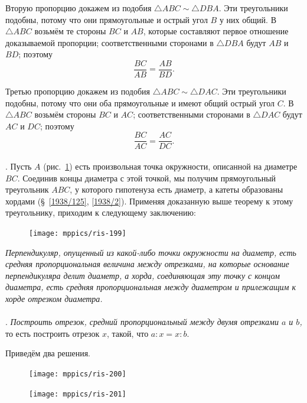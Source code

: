 \documentclass[twoside]{book}
\begin{document}
Вторую пропорцию докажем из подобия $\triangle ABC\sim \triangle DBA$.
Эти треугольники подобны, потому что они прямоугольные и острый угол $B$ у них общий.
В $\triangle ABC$ возьмём те стороны $BC$ и $AB$, которые составляют первое отношение доказываемой пропорции;
соответственными сторонами в $\triangle DBA$ будут $AB$ и $BD$;
поэтому
\[\frac{BC}{AB}=\frac{AB}{BD}.\]

Третью пропорцию докажем из подобия $\triangle ABC\sim \triangle DAC$.
Эти треугольники подобны, потому что они оба прямоугольные и имеют общий острый угол $C$.
В $\triangle ABC$ возьмём стороны $BC$ и $AC$;
соответственными сторонами в $\triangle DAC$ будут $AC$ и $DC$;
поэтому
\[\frac{BC}{AC}=\frac{AC}{DC}.\]

\paragraph{}\label{1938/189}
\mbox{.}
Пусть $A$ (рис.~\ref{1938/ris-199}) есть произвольная точка окружности, описанной на диаметре $BC$.
Соединив концы диаметра с этой точкой, мы получим прямоугольный треугольник $ABC$, у которого гипотенуза есть диаметр, а катеты образованы хордами (§~\ref{1938/125}, \ref{1938/2}).
Применяя доказанную выше теорему к этому треугольнику, приходим к следующему заключению:

\begin{figure}
\centering
\texttt{[image: mppics/ris-199]}
\caption{}\label{1938/ris-199}
\end{figure}

\emph{Перпендикуляр, опущенный из какой-либо точки окружности на диаметр, есть средняя пропорциональная величина между отрезками, на которые основание перпендикуляра делит диаметр, а хорда, соединяющая эту точку с концом диаметра, есть средняя пропорциональная между диаметром и прилежащим к хорде отрезком диаметра.}

\paragraph{}\label{1938/190}
.
\emph{Построить отрезок, средний пропорциональный между двумя отрезками $a$ и $b$,}
то есть построить отрезок $x$, такой, что $a:x= x:b$.

Приведём два решения.

\begin{figure}
\centering
\texttt{[image: mppics/ris-200]}
\caption{}\label{1938/ris-200}
\bigskip
\texttt{[image: mppics/ris-201]}
\caption{}\label{1938/ris-201}
\end{figure}
\end{document}
